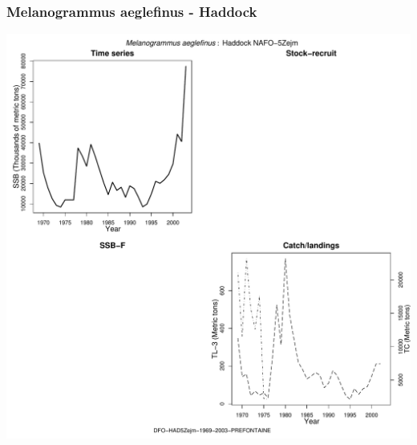 \subsubsection{Melanogrammus aeglefinus - Haddock}
\begin{center}
\includegraphics[width=1.2\textwidth]{../R/figures/DFO-HAD5Zejm-1969-2003-PREFONTAINE.pdf}
\end{center}

